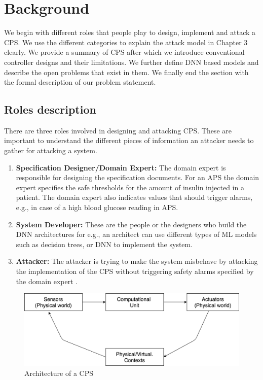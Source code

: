 \chapter{Background}
\label{ch:Chapter2}

We begin with different roles that people play to design, implement and attack a \ac{CPS}. We use the different categories to explain the attack model in Chapter 3 clearly. 
We provide a summary of \ac{CPS} after which we introduce conventional controller designs and their limitations. 
We further define \ac{DNN} based models and describe the open problems that exist in them. 
We finally end the section with the formal description of our problem statement.

\section{Roles description}
There are three roles involved in designing and attacking \ac{CPS}. These are important to understand the different pieces of information an attacker needs to gather for attacking a system.

\begin{enumerate}
	\item \textbf{Specification Designer/Domain Expert:} The domain expert is responsible for designing the specification documents. 
	For an \ac{APS} the domain expert specifies the safe thresholds for the amount of insulin injected in a patient. The domain expert also indicates values that should trigger alarms, e.g., in case of a high blood glucose reading in \ac{APS}.
	\item \textbf{System Developer:} These are the people or the designers who
	build the \ac{DNN} architectures for e.g., an architect can use different types of \ac{ML} models such as decision trees, or \ac{DNN} to implement the system.
	\item \textbf{Attacker:} The attacker is trying to make the system misbehave by attacking the implementation of the \ac{CPS} without triggering safety alarms specified by the domain expert . 
\end{enumerate}

\begin{figure}
	\centering
	\includegraphics[width=0.7\linewidth]{Images/Systemsdescription}
	\caption{Architecture of a CPS}
	\label{fig:systemsdescription}
\end{figure}

